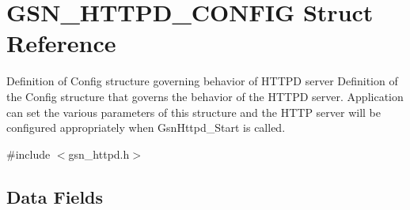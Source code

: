 \hypertarget{a00095}{
\section{GSN\_\-HTTPD\_\-CONFIG Struct Reference}
\label{a00095}
}


Definition of Config structure governing behavior of HTTPD server Definition of the Config structure that governs the behavior of the HTTPD server. Application can set the various parameters of this structure and the HTTP server will be configured appropriately when GsnHttpd\_\-Start is called.  




{\ttfamily \#include $<$gsn\_\-httpd.h$>$}

\subsection*{Data Fields}
